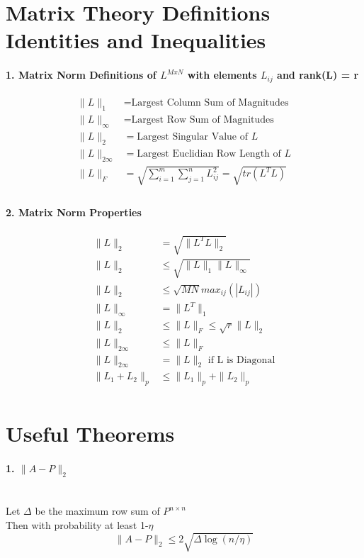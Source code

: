 \documentclass[10pt]{article}
\begin{document}
\section{Matrix Theory Definitions Identities and Inequalities}
\paragraph{1. Matrix Norm Definitions of $L^{MxN}$ with elements $L_{ij}$ and rank(L) = r}
\begin{align*}
\| L \|_1 &=  \mbox{Largest Column Sum of Magnitudes}\\
\| L \|_\infty &= \mbox{Largest Row Sum of Magnitudes}\\
\| L \|_2  &= \mbox{Largest Singular Value of } L\\
\| L \|_{2\infty} &=  \mbox{Largest Euclidian Row Length of } L\\
\| L \|_{F} &=  \sqrt{\sum_{i=1}^{m}\sum_{j=1}^{n}L_{ij}^2} = \sqrt{tr(L^TL)}\\
\end{align*}

\paragraph{2. Matrix Norm Properties}
\begin{align*}
\| L \|_2 &= \sqrt{\| L^TL \|_2}\\
\| L \|_2 &\leq \sqrt{\| L \|_1\| L \|_\infty}\\
\| L \|_2 &\leq \sqrt{MN}max_{ij}(|L_{ij}|)\\
\| L \|_\infty &= \| L^T \|_1\\
\| L \|_{2} &\leq \| L \|_F \leq \sqrt{r} \| L \|_{2}\\
\| L \|_{2\infty} &\leq \| L \|_F\\
\| L \|_{2\infty} &= \| L \|_2 \mbox{   if L is Diagonal}\\
\| L_1 + L_2 \|_p &\leq \| L_1 \|_p+ \| L_2 \|_p\\
\end{align*}

\section{Useful Theorems}
\paragraph{1. $\| A-P\|_{2}$}\mbox{}\\
Let $\Delta$ be the maximum row sum of $P^{n\times n}$\\
Then with probability at least 1-$\eta$
\begin{equation}
\| A-P\|_{2} \leq 2\sqrt{\Delta \log(n/\eta)}
\end{equation}
\end{document}
